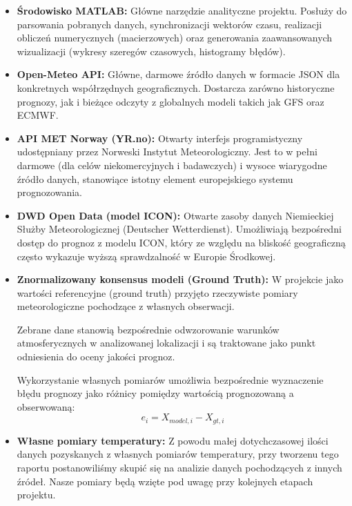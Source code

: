 \documentclass[a4paper,12pt]{article}
\begin{document}
\begin{itemize}
    \item \textbf{Środowisko MATLAB:} Główne narzędzie analityczne projektu. Posłuży do parsowania pobranych danych, synchronizacji wektorów czasu, realizacji obliczeń numerycznych (macierzowych) oraz generowania zaawansowanych wizualizacji (wykresy szeregów czasowych, histogramy błędów).
    
    \item \textbf{Open-Meteo API:} Główne, darmowe źródło danych w formacie JSON dla konkretnych współrzędnych geograficznych. Dostarcza zarówno historyczne prognozy, jak i bieżące odczyty z globalnych modeli takich jak GFS oraz ECMWF.
    

    \item \textbf{API MET Norway (YR.no):} Otwarty interfejs programistyczny udostępniany przez Norweski Instytut Meteorologiczny. Jest to w pełni darmowe (dla celów niekomercyjnych i badawczych) i wysoce wiarygodne źródło danych, stanowiące istotny element europejskiego systemu prognozowania.
    
    \item \textbf{DWD Open Data (model ICON):} Otwarte zasoby danych Niemieckiej Służby Meteorologicznej (Deutscher Wetterdienst). Umożliwiają bezpośredni dostęp do prognoz z modelu ICON, który ze względu na bliskość geograficzną często wykazuje wyższą sprawdzalność w Europie Środkowej.
    
    \item \textbf{Znormalizowany konsensus modeli (Ground Truth):} W projekcie jako wartości referencyjne (ground truth) przyjęto rzeczywiste 
pomiary meteorologiczne pochodzące z własnych obserwacji.

Zebrane dane stanowią bezpośrednie odwzorowanie warunków atmosferycznych 
w analizowanej lokalizacji i są traktowane jako punkt odniesienia do oceny 
jakości prognoz.

Wykorzystanie własnych pomiarów umożliwia bezpośrednie wyznaczenie błędu 
prognozy jako różnicy pomiędzy wartością prognozowaną a obserwowaną:
\[
e_i = X_{model,i} - X_{gt,i}
\]
    \item \textbf{Własne pomiary temperatury:} Z powodu małej dotychczasowej ilości danych pozyskanych z własnych pomiarów temperatury, przy tworzenu tego raportu postanowiliśmy skupić się na analizie danych pochodzących z innych źródeł. Nasze pomiary będą wzięte pod uwagę przy kolejnych etapach projektu.
\end{itemize}
\end{document}

